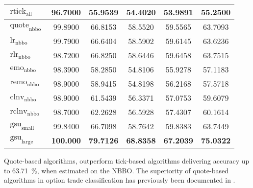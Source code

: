 \begin{table}[ht]
\begin{tabular}{@{}lSSSSS@{}}
        $\operatorname{rtick}_{\mathrm{all}}$  & 96.7000           & 55.9539                            & 54.4020           & 53.9891           & 55.2500           \\ \midrule
        $\operatorname{quote}_{\mathrm{nbbo}}$ & 99.8900           & 66.8153                            & 58.5520           & 59.5565           & 63.7093           \\
        $\operatorname{lr}_{\mathrm{nbbo}}$    & 99.7900           & 66.6404                            & 58.5902           & 59.6145           & 63.6236           \\
        $\operatorname{rlr}_{\mathrm{nbbo}}$   & 98.7200           & 66.8250                            & 58.6446           & 59.6458           & 63.7515           \\
        $\operatorname{emo}_{\mathrm{nbbo}}$   & 98.3900           & 58.2850                            & 54.8106           & 55.9278           & 57.1183           \\
        $\operatorname{remo}_{\mathrm{nbbo}}$  & 98.9000           & 58.9415                            & 54.8198           & 56.2168           & 57.5718           \\
        $\operatorname{clnv}_{\mathrm{nbbo}}$  & 98.9000           & 61.5439                            & 56.3371           & 57.0753           & 59.6079           \\
        $\operatorname{rclnv}_{\mathrm{nbbo}}$ & 98.7000           & 62.2628                            & 56.5928           & 57.4307           & 60.1614           \\ \midrule
        $\operatorname{gsu}_{\mathrm{small}}$  & 99.8400           & 66.7098                            & 58.7642           & 59.8383           & 63.7449           \\
        $\operatorname{gsu}_{\mathrm{large}}$  & \bfseries 100.000 & \bfseries 79.7126                  & \bfseries 68.8358 & \bfseries 67.2039 & \bfseries 75.0322 \\
        \bottomrule
    \end{tabular}
\end{table}


Quote-based algorithms, outperform tick-based algorithms delivering accuracy up to \SI{63.71}{\percent}, when estimated on the \gls{NBBO}. The superiority of quote-based algorithms in option trade classification has previously been documented in \textcites{savickasInferringDirectionOption2003}{grauerOptionTradeClassification2022}.

